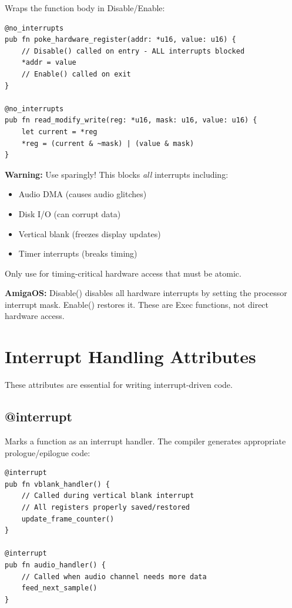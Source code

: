 Wraps the function body in Disable/Enable:

\begin{lstlisting}
@no_interrupts
pub fn poke_hardware_register(addr: *u16, value: u16) {
    // Disable() called on entry - ALL interrupts blocked
    *addr = value
    // Enable() called on exit
}

@no_interrupts
pub fn read_modify_write(reg: *u16, mask: u16, value: u16) {
    let current = *reg
    *reg = (current & ~mask) | (value & mask)
}
\end{lstlisting}

\textbf{Warning:} Use sparingly! This blocks \textit{all} interrupts including:
\begin{itemize}
    \item Audio DMA (causes audio glitches)
    \item Disk I/O (can corrupt data)
    \item Vertical blank (freezes display updates)
    \item Timer interrupts (breaks timing)
\end{itemize}

Only use for timing-critical hardware access that must be atomic.

\begin{comingfromc}
\textbf{AmigaOS:} Disable() disables all hardware interrupts by setting the processor interrupt mask. Enable() restores it. These are Exec functions, not direct hardware access.
\end{comingfromc}

\section{Interrupt Handling Attributes}
\label{sec:interrupt-attributes}

These attributes are essential for writing interrupt-driven code.

\subsection{@interrupt}

Marks a function as an interrupt handler. The compiler generates appropriate prologue/epilogue code:

\begin{lstlisting}
@interrupt
pub fn vblank_handler() {
    // Called during vertical blank interrupt
    // All registers properly saved/restored
    update_frame_counter()
}

@interrupt
pub fn audio_handler() {
    // Called when audio channel needs more data
    feed_next_sample()
}
\end{lstlisting}


